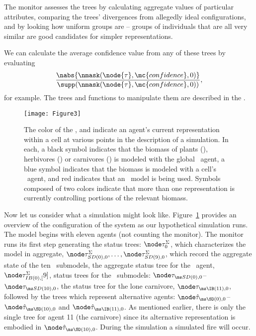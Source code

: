 The monitor assesses the trees by calculating aggregate values of
particular attributes, comparing the trees' divergences from allegedly
ideal con\-fig\-ur\-a\-tions, and by looking how uniform groups are -- groups
of in\-di\-vidu\-als that are all very similar are good candidates for
simpler rep\-re\-sen\-ta\-tions. 

We can calculate the average confidence value from any of these trees
by evaluating \[
\frac{\nabs{\nmask(\node{\tau},
    \mc{confidence},0)}}{\supp(\nmask(\node{\tau},
  \mc{confidence},0))},
\]
for example. The trees and functions to manipulate them are described
in the \appendixname.



\begin{figure}\label{timeline}
\begin{center}
  \texttt{[image: Figure3]}
  \caption{The color of the , and 
    indicate an agent's current rep\-re\-sen\-ta\-tion within a cell
    at various points in the description of a simulation.  In each, a
    black symbol indicates that the biomass of plants (), herbivores
    () or carnivores () is modeled with the global \SD\ agent, a
    blue symbol indicates that the biomass is modeled with a cell's
    \SD\ agent, and red indicates that an \IB\ model is being
    used. Symbols composed of two colors indicate that more than one
    rep\-re\-sen\-ta\-tion is currently controlling portions of the
    relevant biomass.}
\end{center}
\end{figure}

Now let us consider what a simulation might look
like. Figure~\ref{timeline}
provides an overview of the con\-fig\-ur\-a\-tion of the system
as our hypothetical simulation runs. The model begins with eleven
agents (not counting the monitor). The monitor runs its first step
generating the status trees: $\stmA{0}$, which characterizes the model
in aggregate, $\stsdA{0}{0},\ldots,\stsdA{9}{0}$, which record the
aggregate state of the ten \SD\ submodels, the aggregate status tree for
the \IB\ agent, $\stibA{0}[9]$, status trees for the \SD\ submodels:
$\stsd{0}{0}$--$\stsd{10}{0}$, the status tree for the lone carnivore,
$\sta{\IB}{11}{0}$, followed by the trees which represent alternative
agents: $\asta{\SD}{0}{0}$--$\asta{\SD}{10}{0}$ and
$\asta{\IB}{11}{0}$.  As mentioned earlier, there is only the single
tree for agent 11 (the carnivore) since its alternative rep\-re\-sen\-ta\-tion
is embodied in $\asta{\SD}{10}{0}$. During the simulation a simulated
fire will occur.

